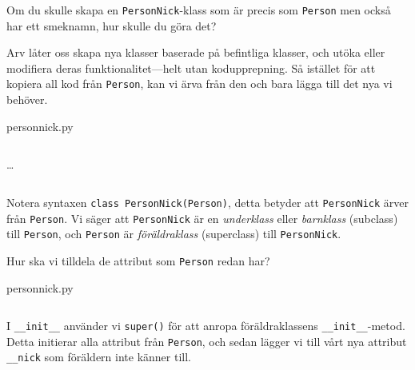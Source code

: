 \begin{exercise}
  Om du skulle skapa en \texttt{PersonNick}-klass som är
  precis som \texttt{Person} men också har ett smeknamn, hur skulle
  du göra det?
\end{exercise}


Arv låter oss skapa nya klasser baserade på befintliga klasser, och utöka eller 
modifiera deras funktionalitet---helt utan kodupprepning.
Så istället för att kopiera all kod från \texttt{Person}, kan vi 
ärva från den och bara lägga till det nya vi behöver.

\begin{frame}[fragile]
  person\textunderscore nick.py \hrulefill
  \inputminted[linenos,firstline=3,lastline=8]{python}{examples/person_nick.py}
  \dots
  \inputminted[linenos,firstline=11,lastline=19]{python}{examples/person_nick.py}
\end{frame}

Notera syntaxen \texttt{class PersonNick(Person)}, detta betyder 
att \texttt{PersonNick} ärver från \texttt{Person}. Vi 
säger att \texttt{PersonNick} är en \emph{underklass} eller 
\emph{barnklass}
(\foreignlanguage{english}{subclass})
till \texttt{Person}, och \texttt{Person} är 
\emph{föräldraklass} 
(\foreignlanguage{english}{superclass})
till \texttt{PersonNick}.

\begin{exercise}
  Hur ska vi tilldela de attribut som \texttt{Person} redan har?
\end{exercise}

\begin{frame}[fragile]
  person\textunderscore nick.py \hrulefill
  \inputminted[linenos,firstline=9,lastline=10]{python}{examples/person_nick.py}
\end{frame}

I \texttt{__init__} använder vi \texttt{super()}
för att anropa föräldraklassens \texttt{__init__}-metod. Detta
initierar alla attribut från \texttt{Person}, och sedan lägger vi
till vårt nya attribut \texttt{__nick} som föräldern inte känner
till.

